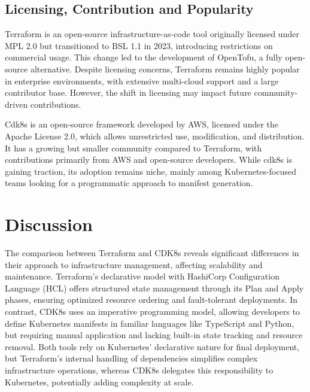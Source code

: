 \documentclass{article}
\begin{document}
\subsection{Licensing, Contribution and Popularity}
\label{sec:usage}

Terraform is an open-source infrastructure-as-code tool originally licensed under MPL 2.0 but transitioned to BSL 1.1 in 2023, introducing restrictions on commercial usage. This change led to the development of OpenTofu, a fully open-source alternative. Despite licensing concerns, Terraform remains highly popular in enterprise environments, with extensive multi-cloud support and a large contributor base. However, the shift in licensing may impact future community-driven contributions.

Cdk8s is an open-source framework developed by AWS, licensed under the Apache License 2.0, which allows unrestricted use, modification, and distribution. It has a growing but smaller community compared to Terraform, with contributions primarily from AWS and open-source developers. While cdk8s is gaining traction, its adoption remains niche, mainly among Kubernetes-focused teams looking for a programmatic approach to manifest generation.



\section{Discussion}
\label{sec:discussion}

The comparison between Terraform and CDK8s reveals significant differences in their approach to infrastructure management, affecting scalability and maintenance. Terraform’s declarative model with HashiCorp Configuration Language (HCL) offers structured state management through its Plan and Apply phases, ensuring optimized resource ordering and fault-tolerant deployments. In contrast, CDK8s uses an imperative programming model, allowing developers to define Kubernetes manifests in familiar languages like TypeScript and Python, but requiring manual application and lacking built-in state tracking and resource removal. Both tools rely on Kubernetes’ declarative nature for final deployment, but Terraform’s internal handling of dependencies simplifies complex infrastructure operations, whereas CDK8s delegates this responsibility to Kubernetes, potentially adding complexity at scale.
\end{document}
